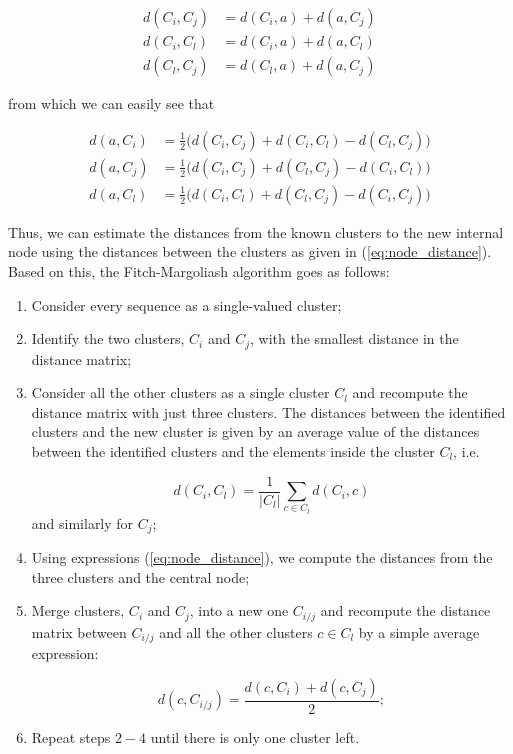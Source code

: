 \begin{eqnarray}
d(C_i, C_j) &= d(C_i, a) + d(a, C_j) \nonumber \\
d(C_i, C_l) &= d(C_i, a) + d(a, C_l) \nonumber\\
d(C_l, C_j) &= d(C_l, a) + d(a, C_j) \nonumber
\end{eqnarray}

from which we can easily see that 

\begin{eqnarray}
d(a, C_i) &= \frac{1}{2}\bigg(d(C_i, C_j) + d(C_i, C_l) - d(C_l, C_j)\bigg)\nonumber \\
d(a, C_j) &= \frac{1}{2}\bigg(d(C_i, C_j) + d(C_l, C_j) - d(C_i, C_l)\bigg)\label{eq:node_distance}\\
d(a, C_l) &= \frac{1}{2}\bigg(d(C_i, C_l) + d(C_l, C_j) - d(C_i, C_j)\bigg)\nonumber 
\end{eqnarray}

Thus, we can estimate the distances from the known clusters to the new internal node using the distances between the clusters as given in (\ref{eq:node_distance}). Based on this, the Fitch-Margoliash algorithm goes as follows:

\begin{enumerate}
    \item Consider every sequence as a single-valued cluster;
    \item Identify the two clusters, $C_i$ and $C_j$, with the smallest distance in the distance matrix;
    \item Consider all the other clusters as a single cluster $C_l$ and recompute the distance matrix with just three clusters. The distances between the identified clusters and the new cluster is given by an average value of the distances between the identified clusters and the elements inside the cluster $C_l$, i.e.
    
    $$d(C_i, C_l) = \frac{1}{|C_l|} \sum_{c\in C_l} d(C_i, c)$$
    and similarly for $C_j$;
    \item Using expressions (\ref{eq:node_distance}), we compute the distances from the three clusters and the central node;
    \item  Merge clusters, $C_i$ and $C_j$, into a new one $C_{i/j}$ and recompute the distance matrix between $C_{i/j}$ and all the other clusters $c\in C_l$ by a simple average expression:
    
    $$d(c, C_{i/j}) = \frac{d(c, C_i) + d(c, C_j)}{2};$$
    
    \item Repeat steps $2-4$ until there is only one cluster left.
\end{enumerate}


